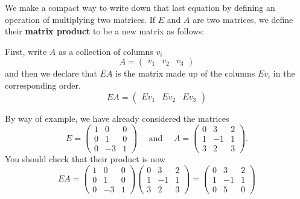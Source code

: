 \documentclass[10pt,]{book}
\newcommand{\terminology}[1]{\textbf{#1}}
\theoremstyle{plain}
\numberwithin{equation}{section}
\begin{document}
        We make a compact way to write down that last equation by defining an
        operation of multiplying two matrices.
        If \(E\) and \(A\) are two matrices, we define their
        \terminology{matrix product}
        to be a new matrix as follows:
\par

        First, write \(A\) as a collection of columns \(v_i\)
        \[
          A = \begin{pmatrix} v_1 &v_2 &v_3 \end{pmatrix}
        \]
        and then we declare that \(EA\) is the matrix made up of the columns
        \(Ev_i\) in the corresponding order.
        \[
          EA = \begin{pmatrix} Ev_1 &Ev_2 &Ev_3 \end{pmatrix}
        \]
\par

        By way of example, we have already considered the matrices
        \[
          E = \begin{pmatrix} 1 &0 &0 \\ 0 &1 &0 \\ 0 &-3 &1 \end{pmatrix} \quad \text{ and } \quad
          A = \begin{pmatrix} 0 &3 &2 \\ 1 &-1 &1 \\ 3 &2 &3 \end{pmatrix}.
        \]
        You should check that their product is now
        \[
          EA = \begin{pmatrix} 1 &0 &0 \\ 0 &1 &0 \\ 0 &-3 &1 \end{pmatrix}\begin{pmatrix} 0 &3 &2 \\ 1 &-1 &1 \\ 3 &2 &3 \end{pmatrix} =
          \begin{pmatrix} 0 &3 &2 \\ 1 &-1 &1 \\ 0 &5 &0 \end{pmatrix}
        \]
\par
\end{document}
